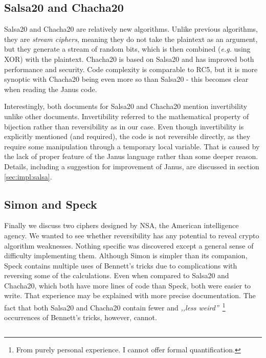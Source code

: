 \documentclass[a4paper,10pt,openright]{memoir}
\newcommand{\eg}{\emph{e.g.}\xspace}
\newcommand{\term}[1]{\textit{#1}}
\begin{document}
\subsection{Salsa20 and Chacha20}

Salsa20 and Chacha20 are relatively new algorithms. Unlike previous 
algorithms, they are \term{stream ciphers}, meaning they do not take 
the plaintext as an argument, but they generate a stream of random 
bits, which is then combined (\eg using XOR) with the plaintext. 
Chacha20 is based on Salsa20 and has improved both performance and 
security. Code complexity is comparable to RC5, but it is more synoptic 
with Chacha20 being even more so than Salsa20 - this becomes clear when 
reading the Janus code.

Interestingly, both documents for Salsa20 and Chacha20 mention 
invertibility unlike other documents. Invertibility referred to the 
mathematical property of bijection rather than reversibility as in 
our case. Even though invertibility is explicitly mentioned (and 
required), the code is not reversible directly, as they require some 
manipulation through a temporary local variable. That is caused by the 
lack of proper feature of the Janus language rather than some deeper 
reason. Details, including a suggestion for improvement of Janus, are 
discussed in section \ref{sec:impl:salsa}.

\subsection{Simon and Speck}

Finally we discuss two ciphers designed by NSA, the American 
intelligence agency. We wanted to see whether reversibility has any 
potential to reveal crypto algorithm weaknesses. Nothing specific was 
discovered except a general sense of difficulty implementing them. 
Although Simon is simpler than its companion, Speck contains multiple 
uses of Bennett's tricks due to complications with reversing some of 
the calculations. Even when compared to Salsa20 and Chacha20, which 
both have more lines of code than Speck, both were easier to write. 
That experience may be explained with more precise documentation. The 
fact that both Salsa20 and Chacha20 contain fewer and \textit{,,less 
weird''}~\footnote{From purely personal experience. I cannot offer 
formal quantification.} occurrences of Bennett's tricks, however, 
cannot.

\begin{lstlisting}
\end{lstlisting}
\end{document}

